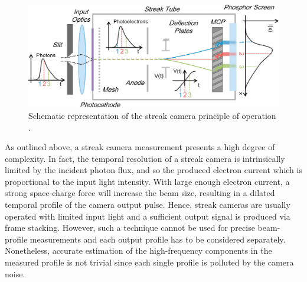 \begin{figure}[!t]
\centering
\includegraphics[width=13.5cm, keepaspectratio]{pictures/streak_AIP_paper}
\caption{ Schematic representation of the streak camera principle of operation \cite{doi:10.1063/1.4930122}.}
\label{fig:streak_hama}
\end{figure}

As outlined above, a streak camera measurement presents a high degree of complexity. In fact, the temporal resolution of a streak camera is intrinsically limited by the incident photon flux, and so the produced electron current which is proportional to the input light intensity. With large enough electron current, a strong space-charge force will increase the beam size, resulting in a dilated temporal profile of the camera output pulse. Hence, streak cameras are usually operated with limited input light and a sufficient output signal is produced via frame stacking. However, such a technique cannot be used for precise beam-profile measurements and each output profile has to be considered separately. Nonetheless, accurate estimation of the high-frequency components in the measured profile is not trivial since each single profile is polluted by the camera noise. 

